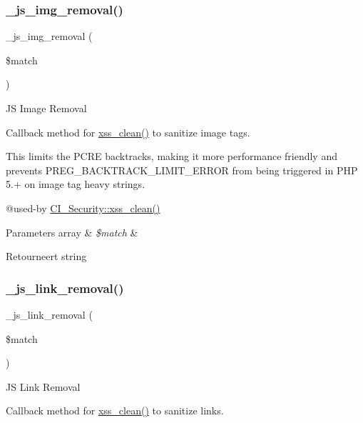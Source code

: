 \subsubsection{\texorpdfstring{\_js\_img\_removal()}{\_js\_img\_removal()}}
{\footnotesize\ttfamily \+\_\+js\+\_\+img\+\_\+removal (\begin{DoxyParamCaption}\item[{}]{\$match }\end{DoxyParamCaption})\hspace{0.3cm}{\ttfamily [protected]}}

JS Image Removal

Callback method for \mbox{\hyperlink{class_c_i___security_acb759426dbab128d3d8164805225381c}{xss\+\_\+clean()}} to sanitize image tags.

This limits the P\+C\+RE backtracks, making it more performance friendly and prevents P\+R\+E\+G\+\_\+\+B\+A\+C\+K\+T\+R\+A\+C\+K\+\_\+\+L\+I\+M\+I\+T\+\_\+\+E\+R\+R\+OR from being triggered in P\+HP 5.+ on image tag heavy strings.

@used-\/by \mbox{\hyperlink{class_c_i___security_acb759426dbab128d3d8164805225381c}{C\+I\+\_\+\+Security\+::xss\+\_\+clean()}} 
\begin{DoxyParams}[1]{Parameters}
array & {\em \$match} & \\
\hline
\end{DoxyParams}
\begin{DoxyReturn}{Retourneert}
string 
\end{DoxyReturn}
\mbox{\label{class_c_i___security_a6b1744acaf85e05c65ab17242dea4f06}} 
\subsubsection{\texorpdfstring{\_js\_link\_removal()}{\_js\_link\_removal()}}
{\footnotesize\ttfamily \+\_\+js\+\_\+link\+\_\+removal (\begin{DoxyParamCaption}\item[{}]{\$match }\end{DoxyParamCaption})\hspace{0.3cm}{\ttfamily [protected]}}

JS Link Removal

Callback method for \mbox{\hyperlink{class_c_i___security_acb759426dbab128d3d8164805225381c}{xss\+\_\+clean()}} to sanitize links.

